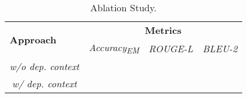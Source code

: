 \begin{table}[]
\centering
\begin{tabular}{l|ccc}
\toprule
\multirow{2}{*}{\textbf{Approach}} & \multicolumn{3}{c}{\textbf{Metrics}}                                  \\ \cline{2-4} 
                                   & \multicolumn{1}{c|}{\textit{Accuracy\textsubscript{EM}}} & \multicolumn{1}{c|}{\textit{ROUGE-L}} & \textit{BLEU-2} \\ \hline
\multicolumn{1}{c|}{\textit{w/o dep. context}}      & \multicolumn{1}{c|}{}         & \multicolumn{1}{c|}{}        &        \\
\multicolumn{1}{c|}{\textit{w/ dep. context}}       & \multicolumn{1}{c|}{}         & \multicolumn{1}{c|}{}        &        \\ \bottomrule
\end{tabular}
\caption{Ablation Study.}
\end{table}